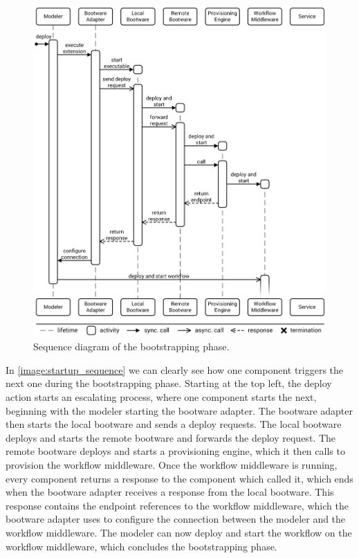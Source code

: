 \begin{figure}[!htbp]
	\centering
	\includegraphics[resolution=600]{process/assets/bootstrapping_sequence}
	\caption{Sequence diagram of the bootstrapping phase.}
	\label{image:startup_sequence}
\end{figure}

In \autoref{image:startup_sequence} we can clearly see how one component triggers the next one during the bootstrapping phase.
Starting at the top left, the deploy action starts an escalating process, where one component starts the next, beginning with the modeler starting the bootware adapter.
The bootware adapter then starts the local bootware and sends a deploy requests.
The local bootware deploys and starts the remote bootware and forwards the deploy request.
The remote bootware deploys and starts a provisioning engine, which it then calls to provision the workflow middleware.
Once the workflow middleware is running, every component returns a response to the component which called it, which ends when the bootware adapter receives a response from the local bootware.
This response contains the endpoint references to the workflow middleware, which the bootware adapter uses to configure the connection between the modeler and the workflow middleware.
The modeler can now deploy and start the workflow on the workflow middleware, which concludes the bootstrapping phase.


